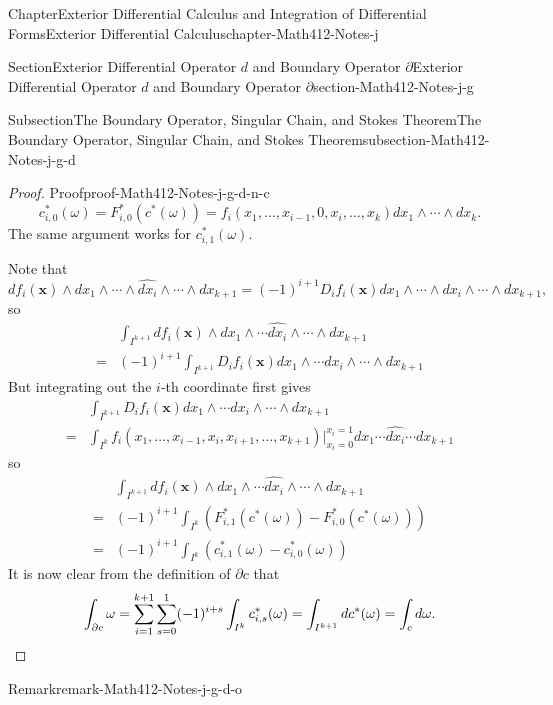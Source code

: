 \documentclass[oneside,10pt,]{book}
\numberwithin{equation}{section}
\newcommand{\qedhere}{\relax}
\newcommand{\bx}{\mathbf{x}}
\newcommand{\amp}{&}
\begin{document}
\begin{chapterptx}{Chapter}{Exterior Differential Calculus and Integration of Differential Forms}{}{Exterior Differential Calculus}{}{}{chapter-Math412-Notes-j}
\begin{sectionptx}{Section}{Exterior Differential Operator \(d\) and Boundary Operator \(\partial\)}{}{Exterior Differential Operator \(d\) and Boundary Operator \(\partial\)}{}{}{section-Math412-Notes-j-g}
\begin{subsectionptx}{Subsection}{The Boundary Operator, Singular Chain, and Stokes Theorem}{}{The Boundary Operator, Singular Chain, and Stokes Theorem}{}{}{subsection-Math412-Notes-j-g-d}
\begin{proof}{Proof}{}{proof-Math412-Notes-j-g-d-n-c}
\begin{equation*}
c_{i, 0}^{*}(\omega) =F_{i, 0}^{*} (c^{*}(\omega))=  f_{i}(x_{1},\ldots, x_{i-1}, 0, x_{i}, \ldots, x_{k}) dx_{1}\wedge \cdots \wedge dx_{k}.
\end{equation*}
The same argument works for \(c_{i, 1}^{*}(\omega)\).%
\par
Note that%
\begin{equation*}
df_{i}(\bx)\wedge dx_{1}\wedge \cdots \wedge \widehat{dx_{i}}\wedge \cdots \wedge dx_{k+1}
=(-1)^{i+1}D_{i} f_{i}(\bx) dx_{1}\wedge \cdots \wedge dx_{i}\wedge \cdots \wedge dx_{k+1},
\end{equation*}
so%
\begin{align*}
\amp \int_{I^{k+1}} df_{i}(\bx)\wedge dx_{1}\wedge \cdots \widehat{dx_{i}}\wedge \cdots \wedge dx_{k+1}\\
= \amp (-1)^{i+1}\int_{I^{k+1}}  D_{i} f_{i}(\bx) dx_{1}\wedge \cdots dx_{i}\wedge \cdots \wedge dx_{k+1}
\end{align*}
But integrating out the \(i\)-th coordinate first gives%
\begin{align*}
\amp \int_{I^{k+1}}  D_{i} f_{i}(\bx) dx_{1}\wedge \cdots dx_{i}\wedge \cdots \wedge dx_{k+1} \\
=\amp \int_{I^{k}} f_{i}(x_{1},\ldots, x_{i-1}, x_{i}, x_{i+1}, \ldots, x_{k+1})\Big|_{x_{i}=0}^{x_{i}=1} 
dx_{1}\cdots \widehat{dx_{i}}\cdots d x_{k+1}
\end{align*}
so%
\begin{align*}
\amp \int_{I^{k+1}} df_{i}(\bx)\wedge dx_{1}\wedge \cdots \widehat{dx_{i}}\wedge \cdots \wedge dx_{k+1}\\
=\amp (-1)^{i+1} \int_{I^{k}} \left( F_{i, 1}^{*}(c^{*}(\omega))- F_{i, 0}^{*}(c^{*}(\omega))\right)\\
=\amp (-1)^{i+1} \int_{I^{k}} \left( c_{i, 1}^{*}(\omega)- c_{i, 0}^{*}(\omega)\right)
\end{align*}
It is now clear from the definition of \(\partial c \)  that%
\begin{equation*}
\int_{\partial c}\omega= \sum_{i=1}^{k+1}\sum_{s=0}^{1}(-1)^{i+s} \int_{I^{k}} c_{i, s}^{*} (\omega)
=\int_{I^{k+1}} d c^{*}( \omega)= \int_{c} d\omega\text{.}\qedhere
\end{equation*}
%
\end{proof}
\begin{remark}{Remark}{}{remark-Math412-Notes-j-g-d-o}%

\end{remark}
\end{subsectionptx}
\end{sectionptx}
\end{chapterptx}
\end{document}
